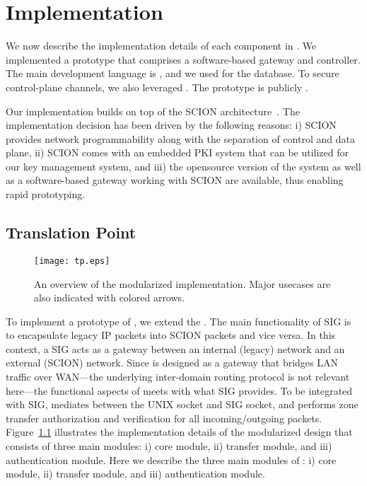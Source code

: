 \chapter{Implementation}
\label{impl}


We now describe the implementation details of each component in \name.
We implemented a prototype that comprises a software-based gateway and controller.
The main development language is , and we used  for the database. To secure control-plane channels, we also leveraged
. The prototype is publicly .

Our implementation builds on top of the SCION architecture~\cite{Perrig2017}.
The implementation decision has been driven by the following reasons: i) SCION provides
network programmability along with the separation of control and data plane, ii) SCION comes
with an embedded PKI system that can be utilized for our key management system, and
iii) the opensource version of the  system as well as a
software-based gateway working with SCION are available, thus enabling rapid prototyping.


\section{Translation Point}
\label{sec:tp}

\begin{figure}[htb]
	\begin{center}
		\texttt{[image: tp.eps]}
	\end{center}
	\caption{An overview of the modularized \tp implementation. Major usecases are also
		indicated with colored arrows.}
	\label{fig:tp}
\end{figure}

To implement a prototype of \tp, we extend the .
The main functionality of SIG is to encapsulate legacy IP packets into SCION packets and
vice versa. In this context, a SIG acts as a gateway between an internal (legacy) network
and an external (SCION) network. Since \tp is designed as a gateway that bridges LAN
traffic over WAN---the underlying inter-domain routing protocol is not relevant here---the
functional aspects of \tp meets with what SIG provides. To be integrated with SIG, \tp
mediates between the UNIX socket and SIG socket, and performs zone transfer authorization
and verification for all incoming/outgoing packets.
Figure~\ref{fig:tp} illustrates
the implementation details of the modularized \tp design that consists of three main modules: i) core module, ii) transfer module, and iii) authentication module.
Here we describe the three main modules of \tp: i) core module, ii) transfer module, and iii) authentication module.

